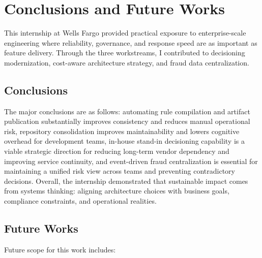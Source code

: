 \chapter{Conclusions and Future Works}

This internship at Wells Fargo provided practical exposure to enterprise-scale engineering where reliability, governance, and response speed are as important as feature delivery. Through the three workstreams, I contributed to decisioning modernization, cost-aware architecture strategy, and fraud data centralization.

\section{Conclusions}

The major conclusions are as follows: automating rule compilation and artifact publication substantially improves consistency and reduces manual operational risk, repository consolidation improves maintainability and lowers cognitive overhead for development teams, in-house stand-in decisioning capability is a viable strategic direction for reducing long-term vendor dependency and improving service continuity, and event-driven fraud centralization is essential for maintaining a unified risk view across teams and preventing contradictory decisions. Overall, the internship demonstrated that sustainable impact comes from systems thinking: aligning architecture choices with business goals, compliance constraints, and operational realities.

\section{Future Works}

Future scope for this work includes:

